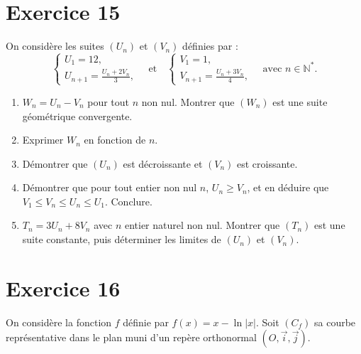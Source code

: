 \documentclass[12pt]{article}
\begin{document}
\section*{Exercice 15}

On considère les suites \((U_n)\) et \((V_n)\) définies par :
\[
\begin{cases}
U_1 = 12, \\
U_{n+1} = \frac{U_n + 2V_n}{3},
\end{cases}
\quad \text{et} \quad
\begin{cases}
V_1 = 1, \\
V_{n+1} = \frac{U_n + 3V_n}{4},
\end{cases}
\quad \text{avec } n \in \mathbb{N}^*.
\]

\begin{enumerate}
    \item \(W_n = U_n - V_n\) pour tout \(n\) non nul. Montrer que \((W_n)\) est une suite géométrique convergente.

    \item Exprimer \(W_n\) en fonction de \(n\).

    \item Démontrer que \((U_n)\) est décroissante et \((V_n)\) est croissante.

    \item Démontrer que pour tout entier non nul \(n\), \(U_n \geq V_n\), et en déduire que \(V_1 \leq V_n \leq U_n \leq U_1\). Conclure.

    \item \(T_n = 3U_n + 8V_n\) avec \(n\) entier naturel non nul. Montrer que \((T_n)\) est une suite constante, puis déterminer les limites de \((U_n)\) et \((V_n)\).
\end{enumerate}

\section*{Exercice 16}

On considère la fonction \(f\) définie par \(f(x) = x - \ln|x|\). Soit \((C_f)\) sa courbe représentative dans le plan muni d’un repère orthonormal \((O, \vec{i}, \vec{j})\).
\end{document}
